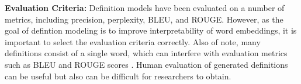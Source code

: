 \textbf{Evaluation Criteria:} Definition models have been evaluated on a
number of metrics, including precision, perplexity, BLEU, and ROUGE. However,
as the goal of defintion modeling is to improve interpretability of word
embeddings, it is important to select the evaluation criteria correctly. Also of
note, many definitions consist of a single word, which can interfere with
evaluation metrics such as BLEU and ROUGE scores \cite{mickus_mark_2019}. Human
evaluation of generated definitions can be useful but also can be difficult for
researchers to obtain.
